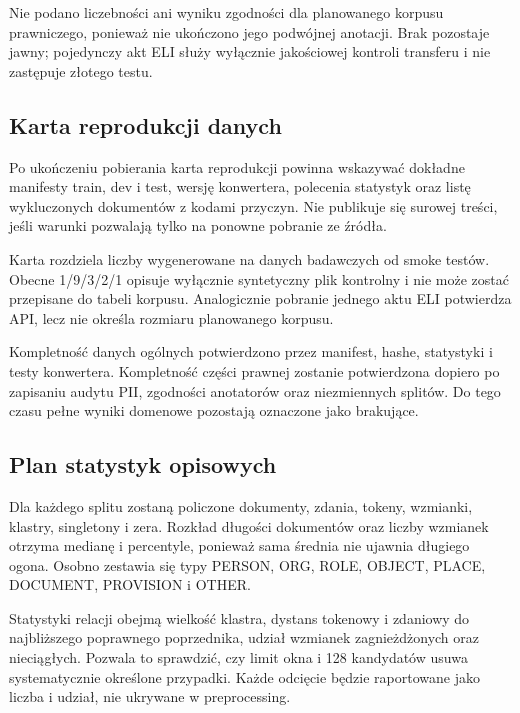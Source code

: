 
Nie podano liczebności ani wyniku zgodności dla planowanego korpusu prawniczego, ponieważ nie ukończono jego podwójnej anotacji. Brak pozostaje jawny; pojedynczy akt ELI służy wyłącznie jakościowej kontroli transferu i nie zastępuje złotego testu.

\subsection{Karta reprodukcji danych}

Po ukończeniu pobierania karta reprodukcji powinna wskazywać dokładne manifesty train, dev i test, wersję konwertera, polecenia statystyk oraz listę wykluczonych dokumentów z kodami przyczyn. Nie publikuje się surowej treści, jeśli warunki pozwalają tylko na ponowne pobranie ze źródła.

Karta rozdziela liczby wygenerowane na danych badawczych od smoke testów. Obecne 1/9/3/2/1 opisuje wyłącznie syntetyczny plik kontrolny i nie może zostać przepisane do tabeli korpusu. Analogicznie pobranie jednego aktu ELI potwierdza API, lecz nie określa rozmiaru planowanego korpusu.

Kompletność danych ogólnych potwierdzono przez manifest, hashe, statystyki i testy konwertera. Kompletność części prawnej zostanie potwierdzona dopiero po zapisaniu audytu PII, zgodności anotatorów oraz niezmiennych splitów. Do tego czasu pełne wyniki domenowe pozostają oznaczone jako brakujące.

\subsection{Plan statystyk opisowych}

Dla każdego splitu zostaną policzone dokumenty, zdania, tokeny, wzmianki, klastry, singletony i zera. Rozkład długości dokumentów oraz liczby wzmianek otrzyma medianę i percentyle, ponieważ sama średnia nie ujawnia długiego ogona. Osobno zestawia się typy PERSON, ORG, ROLE, OBJECT, PLACE, DOCUMENT, PROVISION i OTHER.

Statystyki relacji obejmą wielkość klastra, dystans tokenowy i zdaniowy do najbliższego poprawnego poprzednika, udział wzmianek zagnieżdżonych oraz nieciągłych. Pozwala to sprawdzić, czy limit okna i 128 kandydatów usuwa systematycznie określone przypadki. Każde odcięcie będzie raportowane jako liczba i udział, nie ukrywane w preprocessing.

